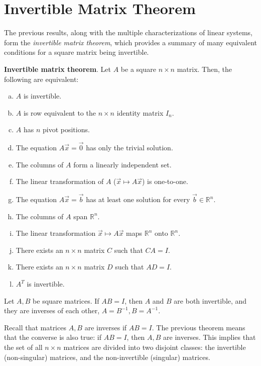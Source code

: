 \documentclass[letterpaper,12pt]{article}
\begin{document}
\section*{Invertible Matrix Theorem}
The previous results, along with the multiple characterizations of linear systems, form the \textit{invertible matrix theorem}, which provides a summary of many equivalent conditions for a square matrix being invertible.

\begin{theorem}
\textbf{Invertible matrix theorem}. Let $A$ be a square $n \times n$ matrix. Then, the following are equivalent:
\begin{enumerate}[(a)]
    \item $A$ is invertible.
    \item $A$ is row equivalent to the $n \times n$ identity matrix $I_n$.
    \item $A$ has $n$ pivot positions.
    \item The equation $A\vec{x} = \vec{0}$ has only the trivial solution.
    \item The columns of $A$ form a linearly independent set.
    \item The linear transformation of $A$ ($\vec{x} \mapsto A\vec{x}$) is one-to-one.
    \item The equation $A\vec{x} = \vec{b}$ has at least one solution for every $\vec{b} \in \mathbb{R}^n$.
    \item The columns of $A$ span $\mathbb{R}^n$.
    \item The linear transformation $\vec{x} \mapsto A\vec{x}$ maps $\mathbb{R}^n$ onto $\mathbb{R}^n$.
    \item There exists an $n \times n$ matrix $C$ such that $CA = I$.
    \item There exists an $n \times n$ matrix $D$ such that $AD = I$.
    \item $A^T$ is invertible.
\end{enumerate}
\end{theorem}

\begin{theorem}
Let $A, B$ be square matrices. If $AB = I$, then $A$ and $B$ are both invertible, and they are inverses of each other, $A = B^{-1}, B = A^{-1}$.
\end{theorem}

Recall that matrices $A, B$ are inverses if $AB = I$. The previous theorem means that the converse is also true: if $AB = I$, then $A, B$ are inverses. This implies that the set of all $n \times n$ matrices are divided into two disjoint classes: the invertible (non-singular) matrices, and the non-invertible (singular) matrices.
\end{document}
